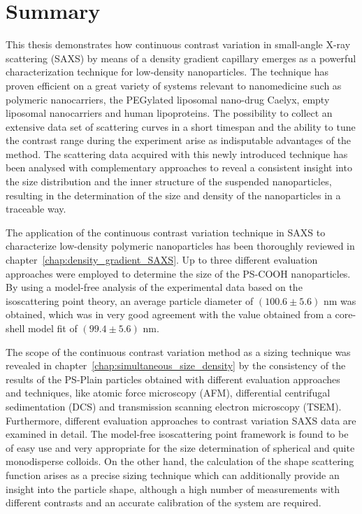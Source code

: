 \chapter{Summary} 
\label{chap:conclusions}
This thesis demonstrates how continuous contrast variation in small-angle X-ray scattering (SAXS) by means of a density gradient capillary emerges as a powerful characterization technique for low-density nanoparticles. The technique has proven efficient on a great variety of systems relevant to nanomedicine such as polymeric nanocarriers, the PEGylated liposomal nano-drug Caelyx, empty liposomal nanocarriers and human lipoproteins. The possibility to collect an extensive data set of scattering curves in a short timespan and the ability to tune the contrast range during the experiment arise as indisputable advantages of the method. The scattering data acquired with this newly introduced technique has been analysed with complementary approaches to reveal a consistent insight into the size distribution and the inner structure of the suspended nanoparticles, resulting in the determination of the size and density of the nanoparticles in a traceable way. 

The application of the continuous contrast variation technique in SAXS to characterize low-density polymeric nanoparticles has been thoroughly reviewed in chapter~\ref{chap:density_gradient_SAXS}. Up to three different evaluation approaches were employed to determine the size of the PS-COOH nanoparticles. By using a model-free analysis of the experimental data based on the isoscattering point theory, an average particle diameter of $\left( 100.6 \pm 5.6 \right)$ nm was obtained, which was in very good agreement with the value obtained from a core-shell model fit of $\left( 99.4 \pm 5.6  \right)$ nm. 

The scope of the continuous contrast variation method as a sizing technique was revealed in chapter~\ref{chap:simultaneous_size_density} by the consistency of the results of the PS-Plain particles obtained with different evaluation approaches and techniques, like atomic force microscopy (AFM), differential centrifugal sedimentation (DCS) and transmission scanning electron microscopy (TSEM). Furthermore, different evaluation approaches to contrast variation SAXS data are examined in detail. The model-free isoscattering point framework is found to be of easy use and very appropriate for the size determination of spherical and quite monodisperse colloids. On the other hand, the calculation of the shape scattering function arises as a precise sizing technique which can additionally provide an insight into the particle shape, although a high number of measurements with different contrasts and an accurate calibration of the system are required.


